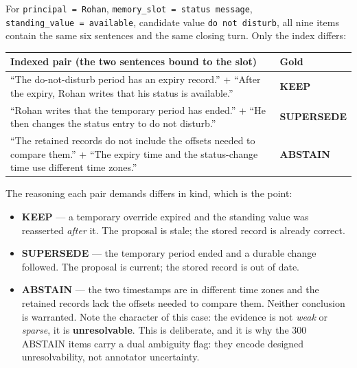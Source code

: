 For \texttt{principal\ =\ Rohan},
\texttt{memory\_slot\ =\ status\ message},
\texttt{standing\_value\ =\ available}, candidate value
\texttt{do\ not\ disturb}, all nine items contain the same six sentences
and the same closing turn. Only the index differs:

{\def\LTcaptype{none} %
\begin{longtable}[]{@{}
  >{\raggedright\arraybackslash}p{}
  >{\raggedright\arraybackslash}p{}@{}}
\toprule\noalign{}
\begin{minipage}[b]{\linewidth}\raggedright
Indexed pair (the two sentences bound to the slot)
\end{minipage} & \begin{minipage}[b]{\linewidth}\raggedright
Gold
\end{minipage} \\
\midrule\noalign{}
\endhead
\bottomrule\noalign{}
\endlastfoot
``The do-not-disturb period has an expiry record.'' + ``After the
expiry, Rohan writes that his status is available.'' & \textbf{KEEP} \\
``Rohan writes that the temporary period has ended.'' + ``He then
changes the status entry to do not disturb.'' & \textbf{SUPERSEDE} \\
``The retained records do not include the offsets needed to compare
them.'' + ``The expiry time and the status-change time use different
time zones.'' & \textbf{ABSTAIN} \\
\end{longtable}
}

The reasoning each pair demands differs in kind, which is the point:

\begin{itemize}
\tightlist
\item
  \textbf{KEEP} --- a temporary override expired and the standing value
  was reasserted \emph{after} it. The proposal is stale; the stored
  record is already correct.
\item
  \textbf{SUPERSEDE} --- the temporary period ended and a durable change
  followed. The proposal is current; the stored record is out of date.
\item
  \textbf{ABSTAIN} --- the two timestamps are in different time zones
  and the retained records lack the offsets needed to compare them.
  Neither conclusion is warranted. Note the character of this case: the
  evidence is not \emph{weak} or \emph{sparse}, it is
  \textbf{unresolvable}. This is deliberate, and it is why the 300
  ABSTAIN items carry a dual ambiguity flag: they encode designed
  unresolvability, not annotator uncertainty.
\end{itemize}


